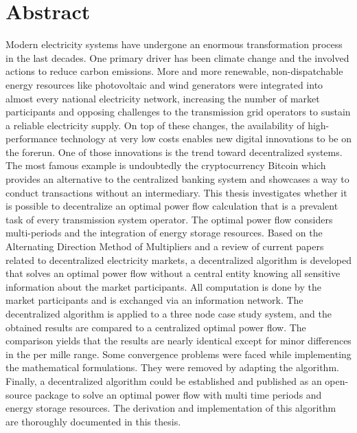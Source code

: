 \section*{Abstract}

Modern electricity systems have undergone an enormous transformation process in the last decades. One primary driver has been climate change and the involved actions to reduce carbon emissions. More and more renewable, non-dispatchable energy resources like photovoltaic and wind generators were integrated into almost every national electricity network, increasing the number of market participants and opposing challenges to the transmission grid operators to sustain a reliable electricity supply. On top of these changes, the availability of high-performance technology at very low costs enables new digital innovations to be on the forerun. One of those innovations is the trend toward decentralized systems. The most famous example is undoubtedly the cryptocurrency Bitcoin which provides an alternative to the centralized banking system and showcases a way to conduct transactions without an intermediary. This thesis investigates whether it is possible to decentralize an optimal power flow calculation that is a prevalent task of every transmission system operator. The optimal power flow considers multi-periods and the integration of energy storage resources. Based on the Alternating Direction Method of Multipliers and a review of current papers related to decentralized electricity markets, a decentralized algorithm is developed that solves an optimal power flow without a central entity knowing all sensitive information about the market participants. All computation is done by the market participants and is exchanged via an information network. The decentralized algorithm is applied to a three node case study system, and the obtained results are compared to a centralized optimal power flow. The comparison yields that the results are nearly identical except for minor differences in the per mille range. Some convergence problems were faced while implementing the mathematical formulations. They were removed by adapting the algorithm. Finally, a decentralized algorithm could be established and published as an open-source package to solve an optimal power flow with multi time periods and energy storage resources. The derivation and implementation of this algorithm are thoroughly documented in this thesis.